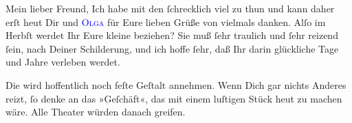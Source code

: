 \pstart{}Mein lieber Freund,\pend
\pstart
           Ich habe mit den \label{K_L03375-1v}\label{K_L03375-1h} ſchrecklich viel zu thun und kann daher erſt heut Dir und \textsc{\textcolor{blue}{Olga}{}\ledrightnote{\textcolor{blue}{Olga Schnitzler}}} für Eure lieben Grüße von \label{K_L03375-2v}\label{K_L03375-2h} vielmals danken. Alſo im Herbſt werdet Ihr Eure kleine \label{K_L03375-3v}\label{K_L03375-3h} beziehen? Sie muß ſehr
               traulich und ſehr reizend ſein, nach Deiner Schilderung, und ich hoffe ſehr, daß Ihr
               darin glückliche Tage und Jahre verleben werdet.\pend
           
\pstart
           Die \label{K_L03375-4v}\label{K_L03375-4h} wird hoffentlich
               noch feſte Geſtalt annehmen. {\pb}Wenn Dich gar nichts
               Anderes reizt, ſo denke an das »Geſchäft«, das mit einem luſtigen Stück heut zu
               machen wäre. Alle Theater würden danach greifen.\pend
           
